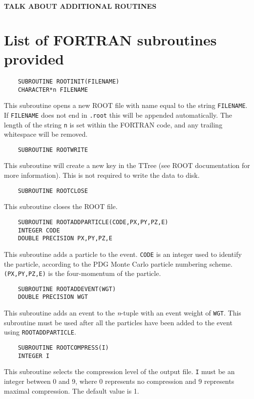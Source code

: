 \documentclass[a4paper,12pt]{article}
\begin{document}
\uppercase{\textbf{Talk about additional routines}}

\section{List of FORTRAN subroutines provided}
\label{sec:routines}
\begin{verbatim}
    SUBROUTINE ROOTINIT(FILENAME)
    CHARACTER*n FILENAME\end{verbatim}
This subroutine opens a new ROOT file with name equal to the string \verb|FILENAME|. If \verb|FILENAME| does not end in \verb|.root| this will be appended automatically. The length of the string \verb|n| is set within the FORTRAN code, and any trailing whitespace will be removed.

\begin{verbatim}
    SUBROUTINE ROOTWRITE\end{verbatim}
This subroutine will create a new key in the TTree (see ROOT documentation for more information). This is not required to write the data to disk.

\begin{verbatim}
    SUBROUTINE ROOTCLOSE\end{verbatim}
This subroutine closes the ROOT file.

\begin{verbatim}
    SUBROUTINE ROOTADDPARTICLE(CODE,PX,PY,PZ,E)
    INTEGER CODE
    DOUBLE PRECISION PX,PY,PZ,E\end{verbatim}
This subroutine adds a particle to the event. \verb|CODE| is an integer used to identify the particle, according to the PDG Monte Carlo particle numbering scheme. \verb|(PX,PY,PZ,E)| is the four-momentum of the particle.

\begin{verbatim}
    SUBROUTINE ROOTADDEVENT(WGT)
    DOUBLE PRECISION WGT\end{verbatim}
This subroutine adds an event to the \emph{n}-tuple with an event weight of \verb|WGT|. This subroutine must be used after all the particles have been added to the event using \verb|ROOTADDPARTICLE|.

\begin{verbatim}
    SUBROUTINE ROOTCOMPRESS(I)
    INTEGER I\end{verbatim}
This subroutine selects the compression level of the output file. \verb|I| must be an integer between 0 and 9, where 0 represents no compression and 9 represents maximal compression. The default value is 1.
\end{document}
